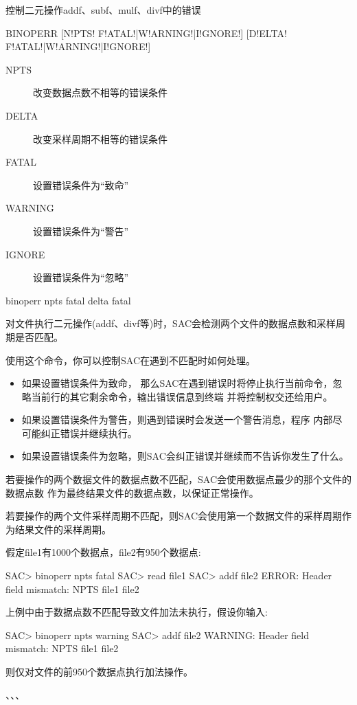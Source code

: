 \label{cmd:binoperr}

控制二元操作addf、subf、mulf、divf中的错误

\begin{SACSTX}
BINOPERR [N!PTS! F!ATAL!|W!ARNING!|I!GNORE!] [D!ELTA! F!ATAL!|W!ARNING!|I!GNORE!]
\end{SACSTX}

\begin{description}
\item [NPTS]  改变数据点数不相等的错误条件
\item [DELTA] 改变采样周期不相等的错误条件
\item [FATAL] 设置错误条件为``致命''
\item [WARNING] 设置错误条件为``警告''
\item [IGNORE]  设置错误条件为``忽略''
\end{description}

\begin{SACDFT}
binoperr npts fatal delta fatal
\end{SACDFT}

对文件执行二元操作(addf、divf等)时，SAC会检测两个文件的数据点数和采样周期是否匹配。

使用这个命令，你可以控制SAC在遇到不匹配时如何处理。
\begin{itemize}
\item 如果设置错误条件为致命，
那么SAC在遇到错误时将停止执行当前命令，忽略当前行的其它剩余命令，输出错误信息到终端
并将控制权交还给用户。
\item 如果设置错误条件为警告，则遇到错误时会发送一个警告消息，程序
内部尽可能纠正错误并继续执行。
\item 如果设置错误条件为忽略，则SAC会纠正错误并继续而不告诉你发生了什么。
\end{itemize}

若要操作的两个数据文件的数据点数不匹配，SAC会使用数据点最少的那个文件的数据点数
作为最终结果文件的数据点数，以保证正常操作。

若要操作的两个文件采样周期不匹配，则SAC会使用第一个数据文件的采样周期作为结果文件的采样周期。

假定file1有1000个数据点，file2有950个数据点:
\begin{SACCode}
SAC> binoperr npts fatal
SAC> read file1
SAC> addf file2
ERROR:  Header field mismatch: NPTS file1 file2
\end{SACCode}

上例中由于数据点数不匹配导致文件加法未执行，假设你输入:
\begin{SACCode}
SAC> binoperr npts warning
SAC> addf file2
WARNING:  Header field mismatch: NPTS file1 file2
\end{SACCode}
则仅对文件的前950个数据点执行加法操作。

、、、
